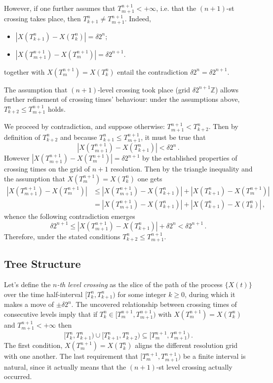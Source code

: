 However, if one further assumes that $T_{m+1}^{n+1} < +\infty$, i.e. that the $(n+1)$-st
crossing takes place, then $T_{k+1}^n \neq T_{m+1}^{n+1}$. Indeed, \begin{itemize}
	\item $|X(T_{k+1}^n)-X(T_k^n)| = \delta 2^n$;
	\item $|X(T_{m+1}^{n+1})-X(T_m^{n+1})| = \delta 2^{n+1}$.
\end{itemize}
together with $X(T_m^{n+1}) = X(T_k^n)$ entail the contradiction $\delta 2^n = \delta 2^{n+1}$.

The assumption that $(n+1)$-level crossing took place (grid $\delta 2^{n+1} \mathbb{Z}$)
allows further refinement of crossing times' behaviour: under the assumptions above,
$T_{k+2}^n\leq T_{m+1}^{n+1}$ holds.

We proceed by contradiction, and suppose otherwise: $T_{m+1}^{n+1} < T_{k+2}^n$.
Then by definition of $T_{k+2}^n$ and because $T_{k+1}^n \leq T_{m+1}^{n+1}$, it
must be true that
\[ |X(T_{m+1}^{n+1}) - X(T_{k+1}^n)| < \delta 2^n \,.\]
However $|X(T_{m+1}^{n+1}) - X(T_m^{n+1})| = \delta 2^{n+1}$ by the established
properties of crossing times on the grid of $n+1$ resolution. Then by the triangle
inequality and the assumption that $X(T_m^{n+1}) = X(T_k^n)$ one gets
\begin{align*}
    |X(T_{m+1}^{n+1}) - X(T_m^{n+1})| 
    & \leq |X(T_{m+1}^{n+1}) - X(T_{k+1}^n)| + |X(T_{k+1}^n) - X(T_m^{n+1})| \\
    & = |X(T_{m+1}^{n+1}) - X(T_{k+1}^n)| + |X(T_{k+1}^n) - X(T_k^n)|\,,
\end{align*}
whence the following contradiction emerges
\[
\delta 2^{n+1}
\leq |X(T_{m+1}^{n+1}) - X(T_{k+1}^n)| + \delta 2^n
< \delta 2^{n+1}\,.
\]
Therefore, under the stated conditions $T_{k+2}^n\leq T_{m+1}^{n+1}$.



\subsection{Tree Structure} %
\label{sub:tree_structure}

Let's define the \emph{$n$-th level crossing} as the slice of the path of the process
$\{X(t)\}$ over the time half-interval $[T_k^n,T_{k+1}^n)$ for some integer $k\geq 0$,
during which it makes a move of $\pm \delta 2^n$. The uncovered relationship between
crossing times of consecutive levels imply that if $T_k^n \in [T_m^{n+1}, T_{m+1}^{n+1})$
with $X(T_m^{n+1}) = X(T_k^n)$ and $T_{m+1}^{n+1} < +\infty$ then
\[
\bigl[T_k^n,T_{k+1}^n\bigr) \cup \bigl[T_{k+1}^n,T_{k+2}^n\bigr)
\subseteq \bigl[T_m^{n+1},T_{m+1}^{n+1}\bigr) \,.
\]
The first condition, $X(T_m^{n+1}) = X(T_k^n)$ aligns the different resolution grid
with one another. The last requirement that $[T_m^{n+1}, T_{m+1}^{n+1})$ be a finite
interval is natural, since it actually means that the $(n+1)$-st level crossing actually
occurred.

